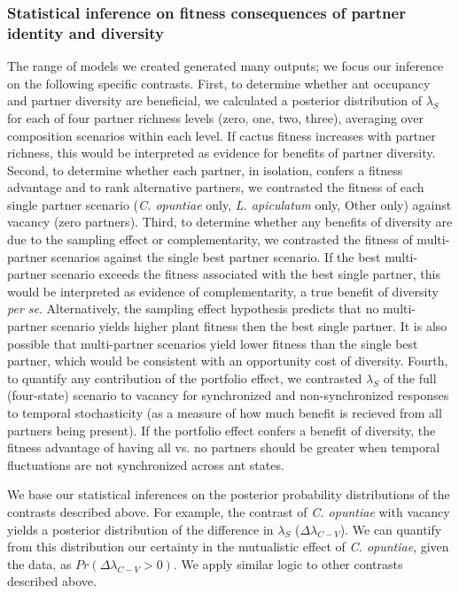 \documentclass[11pt]{article}
\begin{document}
\subsubsection*{Statistical inference on fitness consequences of partner identity and diversity}
The range of models we created generated many outputs; we focus our inference on the following specific contrasts. 
First, to determine whether ant occupancy and partner diversity are beneficial, we calculated a posterior distribution of $\lambda_{S}$ for each of four partner richness levels (zero, one, two, three), averaging over composition scenarios within each level. 
If cactus fitness increases with partner richness, this would be interpreted as evidence for benefits of partner diversity. 
Second, to determine whether each partner, in isolation, confers a fitness advantage and to rank alternative partners, we contrasted the fitness of each single partner scenario (\textit{C. opuntiae} only, \textit{L. apiculatum} only, Other only) against vacancy (zero partners). 
Third, to determine whether any benefits of diversity are due to the sampling effect or complementarity, we contrasted the fitness of multi-partner scenarios against the single best partner scenario. 
If the best multi-partner scenario exceeds the fitness associated with the best single partner, this would be interpreted as evidence of complementarity, a true benefit of diversity \emph{per se}. 
Alternatively, the sampling effect hypothesis predicts that no multi-partner scenario yields higher plant fitness then the best single partner. 
It is also possible that multi-partner scenarios yield lower fitness than the single best partner, which would be consistent with an opportunity cost of diversity. 
Fourth, to quantify any contribution of the portfolio effect, we contrasted $\lambda_{S}$ of the full (four-state) scenario to vacancy for synchronized and non-synchronized responses to temporal stochasticity (as a measure of how much benefit is recieved from all partners being present). 
If the portfolio effect confers a benefit of diversity, the fitness advantage of having all vs. no partners should be greater when temporal fluctuations are not synchronized across ant states.

We base our statistical inferences on the posterior probability distributions of the contrasts described above. 
For example, the contrast of \textit{C. opuntiae} with vacancy yields a posterior distribution of the difference in $\lambda_{S}$ ($\Delta\lambda_{C-V}$). 
We can quantify from this distribution our certainty in the mutualistic effect of \textit{C. opuntiae}, given the data, as $Pr(\Delta\lambda_{C-V}>0)$. 
We apply similar logic to other contrasts described above. 
\end{document}

